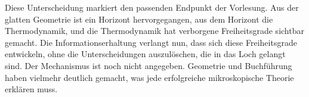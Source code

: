 Diese Unterscheidung markiert den passenden Endpunkt der Vorlesung. Aus der glatten Geometrie ist ein Horizont hervorgegangen, aus dem Horizont die Thermodynamik, und die Thermodynamik hat verborgene Freiheitsgrade sichtbar gemacht. Die Informationserhaltung verlangt nun, dass sich diese Freiheitsgrade entwickeln, ohne die Unterscheidungen auszulöschen, die in das Loch gelangt sind. Der Mechanismus ist noch nicht angegeben. Geometrie und Buchführung haben vielmehr deutlich gemacht, was jede erfolgreiche mikroskopische Theorie erklären muss.
